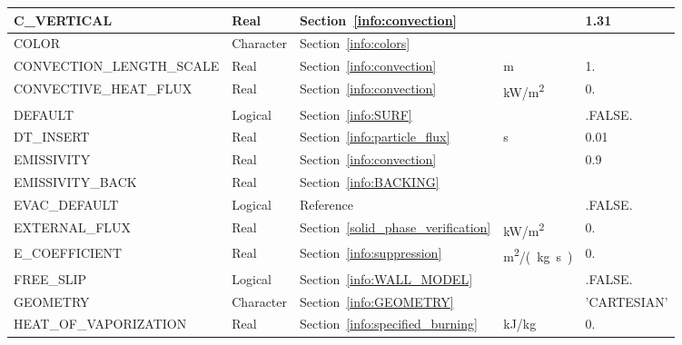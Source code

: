 \documentclass[11pt]{book}
\begin{document}
\begin{longtable}{@{\extracolsep{\fill}}|l|l|l|l|l|}
{\ct C\_VERTICAL}                     & Real            & Section~\ref{info:convection}             &                     & 1.31                    \\ \hline
{\ct COLOR    }                       & Character       & Section~\ref{info:colors}                 &                     &                         \\ \hline
{\ct CONVECTION\_LENGTH\_SCALE}       & Real            & Section~\ref{info:convection}             & m                   & 1.                      \\ \hline
{\ct CONVECTIVE\_HEAT\_FLUX}          & Real            & Section~\ref{info:convection}             & \si{kW/m^2}         & 0.                      \\ \hline
{\ct DEFAULT}                         & Logical         & Section~\ref{info:SURF}                   &                     & {\ct .FALSE.}           \\ \hline
{\ct DT\_INSERT}                      & Real            & Section~\ref{info:particle_flux}          & s                   & 0.01                    \\ \hline
{\ct EMISSIVITY}                      & Real            & Section~\ref{info:convection}             &                     & 0.9                     \\ \hline
{\ct EMISSIVITY\_BACK}                & Real            & Section~\ref{info:BACKING}                &                     &                         \\ \hline
{\ct EVAC\_DEFAULT}                   & Logical         & Reference~\cite{FDS_Evac_Users_Guide}     &                     & {\ct .FALSE.}           \\ \hline
{\ct EXTERNAL\_FLUX}                  & Real            & Section~\ref{solid_phase_verification}    & \si{kW/m^2}         & 0.                      \\ \hline
{\ct E\_COEFFICIENT}                  & Real            & Section~\ref{info:suppression}            & \si{m^2/(kg.s)}     & 0.                      \\ \hline
{\ct FREE\_SLIP}                      & Logical         & Section~\ref{info:WALL_MODEL}             &                     & {\ct .FALSE.}           \\ \hline
{\ct GEOMETRY}                        & Character       & Section~\ref{info:GEOMETRY}               &                     & {\ct 'CARTESIAN'}       \\ \hline
{\ct HEAT\_OF\_VAPORIZATION}          & Real            & Section~\ref{info:specified_burning}      & kJ/kg               & 0.                      \\ \hline

\end{longtable}
\end{document}

